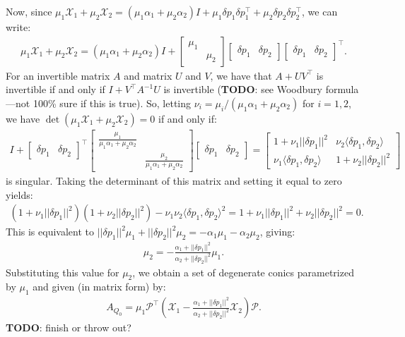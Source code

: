 \documentclass{article}
\begin{document}
Now, since
$\mu_1 \mathcal{X}_1 + \mu_2 \mathcal{X}_2 = (\mu_1 \alpha_1 + \mu_2 \alpha_2) I + \mu_1
\delta p_1 \delta p_1^\top + \mu_2 \delta p_2 \delta p_2^\top$, we can write:
\begin{align*}
  \mu_1 \mathcal{X}_1 + \mu_2 \mathcal{X}_2 = (\mu_1 \alpha_1 + \mu_2 \alpha_2) I + \begin{bmatrix} \mu_1 & \\ & \mu_2 \end{bmatrix} \begin{bmatrix} \delta p_1 & \delta p_2 \end{bmatrix} \begin{bmatrix} \delta p_1 & \delta p_2 \end{bmatrix}^\top.
\end{align*}
For an invertible matrix $A$ and matrix $U$ and $V$, we have that
$A + UV^\top$ is invertible if and only if $I + V^\top A^{-1} U$ is
invertible (\textbf{TODO}: see Woodbury formula---not 100\% sure if
this is true). So, letting
$\nu_i = \mu_i/(\mu_1 \alpha_1 + \mu_2 \alpha_2)$ for $i = 1, 2$, we
have $\det(\mu_1 \mathcal{X}_1 + \mu_2 \mathcal{X}_2) = 0$ if and only if:
\begin{align*}
  I + \begin{bmatrix} \delta p_1 & \delta p_2 \end{bmatrix}^\top \begin{bmatrix} \frac{\mu_1}{\mu_1 \alpha_1 + \mu_2 \alpha_2} & \\ & \frac{\mu_2}{\mu_1 \alpha_1 + \mu_2 \alpha_2} \end{bmatrix} \begin{bmatrix} \delta p_1 & \delta p_2 \end{bmatrix} = \begin{bmatrix} 1 + \nu_1 ||\delta p_1||^2 & \nu_2 \langle \delta p_1, \delta p_2 \rangle \\ \nu_1 \langle \delta p_1, \delta p_2 \rangle & 1 + \nu_2 ||\delta p_2||^2 \end{bmatrix}
\end{align*}
is singular. Taking the determinant of this matrix and setting it
equal to zero yields:
\begin{align*}
  {(1 + \nu_1 ||\delta p_1||^2)}{(1 + \nu_2 ||\delta p_2||^2)} - \nu_1 \nu_2 \langle \delta p_1, \delta p_2 \rangle^2 = 1 + \nu_1 ||\delta p_1||^2 + \nu_2 ||\delta p_2||^2 = 0.
\end{align*}
This is equivalent to $||\delta p_1||^2 \mu_1 + ||\delta p_2||^2 \mu_2 = -\alpha_1 \mu_1 - \alpha_2 \mu_2$, giving:
\begin{align*}
  \mu_2 = -\frac{\alpha_1 + ||\delta p_1||^2}{\alpha_2 + ||\delta p_2||^2} \mu_1.
\end{align*}
Substituting this value for $\mu_2$, we obtain a set of degenerate
conics parametrized by $\mu_1$ and given (in matrix form) by:
\begin{align*}
  A_{Q_0} = \mu_1 \mathcal{P}^\top \left(\mathcal{X}_1 - \frac{\alpha_1 + ||\delta p_1||^2}{\alpha_2 + ||\delta p_2||^2} \mathcal{X}_2\right) \mathcal{P}.
\end{align*}
\textbf{TODO}: finish or throw out?
\end{document}
